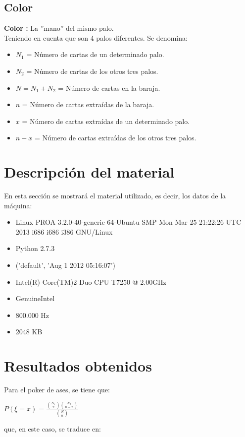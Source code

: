 \documentclass[spanish,a4paper,12pt]{report}
\begin{document}
\subsection{Color}
\textbf{Color :} La ''mano'' del mismo palo.\\

Teniendo en cuenta que son 4 palos diferentes. Se denomina:\\

\begin{itemize}
\item{$N_1$ = Número de cartas de un determinado palo.}
\item{$N_2$ = Número de cartas de los otros tres palos.} 
\item{$N=N_1 + N_2$ = Número de cartas en la baraja.}
\item{$n$ = Número de cartas extraídas de la baraja.}
\item{$x$ = Número de cartas extraídas de un determinado palo.}
\item{$n-x$ = Número de cartas extraídas de los otros tres palos.}
\end{itemize}

\section{Descripción del material}
En esta sección se mostrará el material utilizado, es decir, los datos de la máquina:
\begin{itemize}
\item Linux PROA 3.2.0-40-generic 64-Ubuntu SMP Mon Mar 25 21:22:26 UTC 2013 i686 i686 i386 GNU/Linux
\item Python 2.7.3
\item ('default', 'Aug  1 2012 05:16:07')
\item Intel(R) Core(TM)2 Duo CPU     T7250  @ 2.00GHz
\item GenuineIntel
\item 800.000 Hz
\item 2048 KB
\end{itemize}
\section{Resultados obtenidos}


Para el poker de ases, se tiene que:

\centerline{$P(\xi=x)=\frac {\binom {N_1} {x} \binom {N_2} {n-x}} { \binom {N} {n} }$}

que, en este caso, se traduce en:
\ \\
\end{document}
